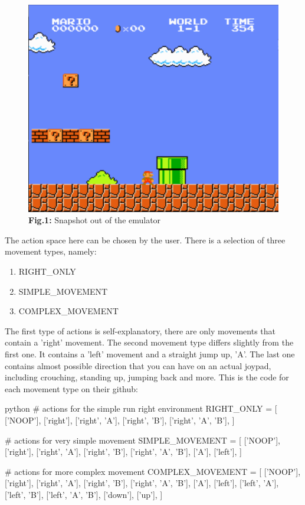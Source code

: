 \documentclass{article}
\numberwithin{equation}{section}
\numberwithin{equation}{section}
\begin{document}
\begin{figure}[H]
	\centering
	
	\includegraphics[scale=0.5]{fig1.png}
	\\	
	\vspace{0.1in}
	\textbf{Fig.1:} Snapshot out of the emulator
	\\
	\label{fig:Fig.1}
\end{figure}


The action space here can be chosen by the user. There is a selection of three movement types, namely:

\begin{enumerate}
\item RIGHT\_ONLY
\item SIMPLE\_MOVEMENT
\item COMPLEX\_MOVEMENT
\end{enumerate}

The first type of actions is self-explanatory, there are only movements that contain a 'right' movement. The second movement type differs slightly from the first one. It contains a 'left' movement and a straight jump up, 'A'. The last one contains almost possible direction that you can have on an actual joypad, including crouching, standing up, jumping back and more. This is the code for each movement type on their github:

\begin{mintedbox}{python}
 # actions for the simple run right environment
RIGHT_ONLY = [
    ['NOOP'],
    ['right'],
    ['right', 'A'],
    ['right', 'B'],
    ['right', 'A', 'B'],
]

# actions for very simple movement
SIMPLE_MOVEMENT = [
    ['NOOP'],
    ['right'],
    ['right', 'A'],
    ['right', 'B'],
    ['right', 'A', 'B'],
    ['A'],
    ['left'],
]

# actions for more complex movement
COMPLEX_MOVEMENT = [
    ['NOOP'],
    ['right'],
    ['right', 'A'],
    ['right', 'B'],
    ['right', 'A', 'B'],
    ['A'],
    ['left'],
    ['left', 'A'],
    ['left', 'B'],
    ['left', 'A', 'B'],
    ['down'],
    ['up'],
]
\end{mintedbox}
\end{document}
